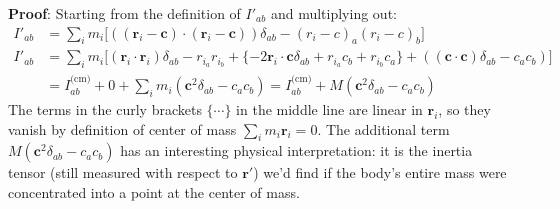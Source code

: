 \documentclass[11pt, a4paper]{article}
\begin{document}
\textbf{Proof}: Starting from the definition of $ I'_{ab} $ and multiplying out:
\begin{align*}
	I'_{ab} &= \sum_{i} m_{i} \big [((\bm{r}_i - \bm{c}) \cdot (\bm{r}_i - \bm{c}) )\delta_{a b} - (r_i - c)_{a}(r_i - c)_{b}  \big]\\
	I'_{ab} &= \sum_{i} m_{i} \big[ (\bm{r}_{i}\cdot \bm{r}_{i}) \delta_{a b} - r_{i_{a}}r_{i_{b}} + \{-2\bm{r}_i \cdot \bm{c}\delta_{a b} + r_{i_{a}}c_{b} + r_{i_{b}}c_{a} \} + ((\bm{c}\cdot \bm{c}) \delta_{ab} - c_{a}c_{b}) \big]\\
	&= I^{\text{(cm)}}_{ab} + 0 + \sum_{i}m_{i}  (\bm{c}^{2} \delta_{ab} - c_{a} c_{b} ) = I_{ab}^{\text{(cm)}} +  M(\bm{c}^{2} \delta_{ab} - c_{a} c_{b} )
\end{align*}
The terms in the curly brackets $ \{\cdots \} $ in the middle line are linear in $ \bm{r}_{i} $, so they vanish by definition of center of mass $ \sum_{i}m_i \bm{r}_i = 0 $. The additional term $ M(\bm{c}^{2}\delta_{ab} - c_{a}c_{b}) $ has an interesting physical interpretation: it is the inertia tensor (still measured with respect to $ \bm{r}' $) we'd find if the body's entire mass were concentrated into a point at the center of mass.
\end{document}
